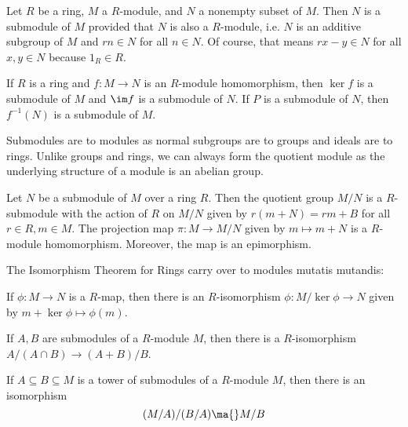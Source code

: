 \begin{dfn}[Submodule]
Let $R$ be a ring, $M$ a $R$-module, and $N$ a nonempty subset of $M$. Then $N$ is a submodule of $M$ provided that $N$ is also a $R$-module, i.e. $N$ is an additive subgroup of $M$ and $rn \in N$ for all $n \in N$. Of course, that means $rx-y \in N$ for all $x,y \in N$ because $1_R \in R$.
\end{dfn}


\begin{ex}
If $R$ is a ring and $f: M \rightarrow N$ is an $R$-module homomorphism, then $\ker f$ is a submodule of $M$ and $\im f$ is a submodule of $N$. If $P$ is a submodule of $N$, then $f^{-1}(N)$ is a submodule of $M$. \xqed
\end{ex}


\begin{rem}
Submodules are to modules as normal subgroups are to groups and ideals are to  rings. Unlike groups and rings, we can always form the quotient module as the underlying structure of a module is an abelian group. 
\end{rem}


\begin{thm}
Let $N$ be a submodule of $M$ over a ring $R$. Then the quotient group $M/N$ is a $R$-submodule with the action of $R$ on $M/N$ given by $r(m+N)=rm+B$ for all $r \in R, m \in M$. The projection map $\pi: M \rightarrow M/N$ given by $m \mapsto m+N$ is a $R$-module homomorphism. Moreover, the map is an epimorphism. 
\end{thm}


The Isomorphism Theorem for Rings carry over to modules mutatis mutandis:

\begin{thm}
If $\phi: M \to N$ is a $R$-map, then there is an $R$-isomorphism $\phi: M/\ker \phi \to N$ given by $m+\ker \phi \mapsto \phi(m)$. 
\end{thm}

\begin{thm}
If $A,B$ are submodules of a $R$-module $M$, then there is a $R$-isomorphism $A/(A \cap B) \to (A+B)/B$.
\end{thm}

\begin{thm}
If $A \subseteq B \subseteq M$ is a tower of submodules of a $R$-module $M$, then there is an isomorphism 
	\[
	(M/A)/(B/A) \ma{} M/B
	\]
\end{thm}

